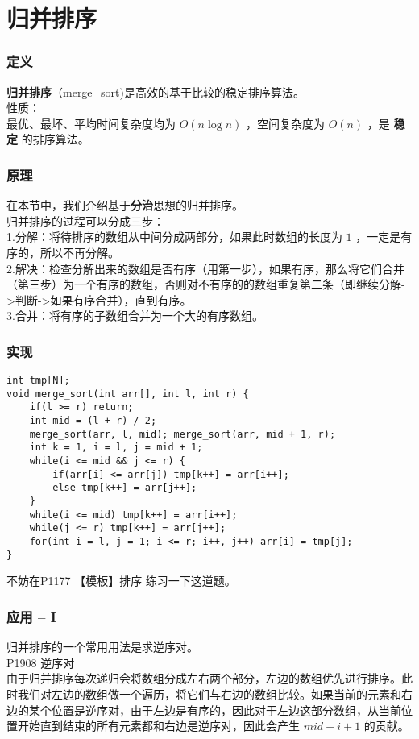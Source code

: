 \documentclass{beamer}
\newcommand{\fdf}[1]{\alert{\textbf{#1}}}
\begin{document}
\section{归并排序}
\begin{frame}
\frametitle{定义}
\fdf{归并排序}（merge\_sort)是高效的基于比较的稳定排序算法。\\ 
性质：\\
最优、最坏、平均时间复杂度均为 $O(n\log n)$ ，空间复杂度为 $O(n)$ ，是 \fdf{稳定} 的排序算法。
\end{frame}
\begin{frame}
\frametitle{原理}
在本节中，我们介绍基于\fdf{分治}思想的归并排序。\\
归并排序的过程可以分成三步：\\ 
1.分解：将待排序的数组从中间分成两部分，如果此时数组的长度为 $1$ ，一定是有序的，所以不再分解。 \\ 
2.解决：检查分解出来的数组是否有序（用第一步），如果有序，那么将它们合并（第三步）为一个有序的数组，否则对不有序的的数组重复第二条（即继续分解->判断->如果有序合并），直到有序。 \\
3.合并：将有序的子数组合并为一个大的有序数组。 \\
\end{frame}
\begin{frame}[fragile]
\frametitle{实现}
\begin{onlyenv}
\begin{verbatim}
int tmp[N];
void merge_sort(int arr[], int l, int r) {
    if(l >= r) return;
    int mid = (l + r) / 2;
    merge_sort(arr, l, mid); merge_sort(arr, mid + 1, r);
    int k = 1, i = l, j = mid + 1;
    while(i <= mid && j <= r) {
        if(arr[i] <= arr[j]) tmp[k++] = arr[i++];
        else tmp[k++] = arr[j++];
    }
    while(i <= mid) tmp[k++] = arr[i++];
    while(j <= r) tmp[k++] = arr[j++];
    for(int i = l, j = 1; i <= r; i++, j++) arr[i] = tmp[j];
}
\end{verbatim}
\end{onlyenv}
不妨在P1177	【模板】排序 练习一下这道题。
\end{frame}
\begin{frame}
\frametitle{应用 -- I}
归并排序的一个常用用法是求逆序对。\\
P1908 逆序对\\ 
由于归并排序每次递归会将数组分成左右两个部分，左边的数组优先进行排序。此时我们对左边的数组做一个遍历，将它们与右边的数组比较。如果当前的元素和右边的某个位置是逆序对，由于左边是有序的，因此对于左边这部分数组，从当前位置开始直到结束的所有元素都和右边是逆序对，因此会产生 $mid - i + 1$ 的贡献。	\\ 
\end{frame}
\end{document}
